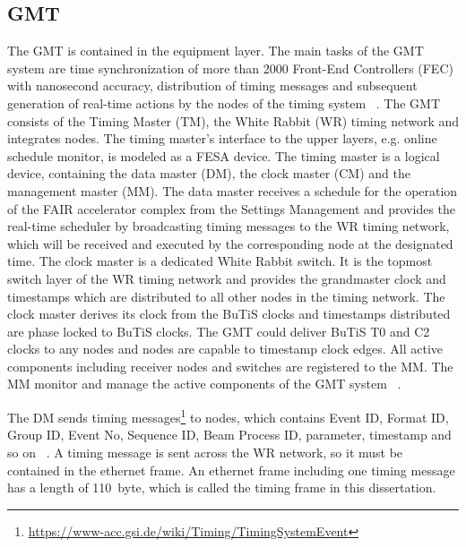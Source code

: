 \subsection{GMT}
The GMT is contained in the equipment layer. The main tasks of the GMT system are time synchronization of more than 2000 Front-End Controllers (\gls{FEC}) with nanosecond accuracy, distribution of timing messages and subsequent generation of real-time actions by the nodes of the timing system ~\cite{beck_new_2012}. The GMT consists of the Timing Master (\gls{TM}), the White Rabbit (WR) timing network and integrates nodes. The timing master's interface to the upper layers, e.g. online schedule monitor, is modeled as a FESA device. The timing master is a logical device, containing the data master (\gls{DM}), the clock master (\gls{CM}) and the management master (\gls{MM}). The data master receives a schedule for the operation of the FAIR accelerator complex from the Settings Management and provides the real-time scheduler by broadcasting timing messages to the WR timing network, which will be received and executed by the corresponding node at the designated time. The clock master is a dedicated White Rabbit switch. It is the topmost switch layer of the WR timing network and provides the grandmaster clock and timestamps which are distributed to all other nodes in the timing network. The clock master derives its clock from the BuTiS clocks and timestamps distributed are phase locked to BuTiS clocks. The GMT could deliver BuTiS T0 and C2 clocks to any nodes and nodes are capable to timestamp clock edges. All active components including receiver nodes and switches are registered to the MM. The MM monitor and manage the active components of the GMT system ~\cite{beck_general_????}.

The DM sends timing messages\footnote{\url{https://www-acc.gsi.de/wiki/Timing/TimingSystemEvent}} to nodes, which contains Event ID, Format ID, Group ID, Event No, Sequence ID, Beam Process ID, parameter, timestamp and so on ~\cite{beck_timing_2015}. A timing message is sent across the WR network, so it must be contained in the ethernet frame. An ethernet frame including one timing message has a length of \SI{110}{byte}, which is called the timing frame in this dissertation.

